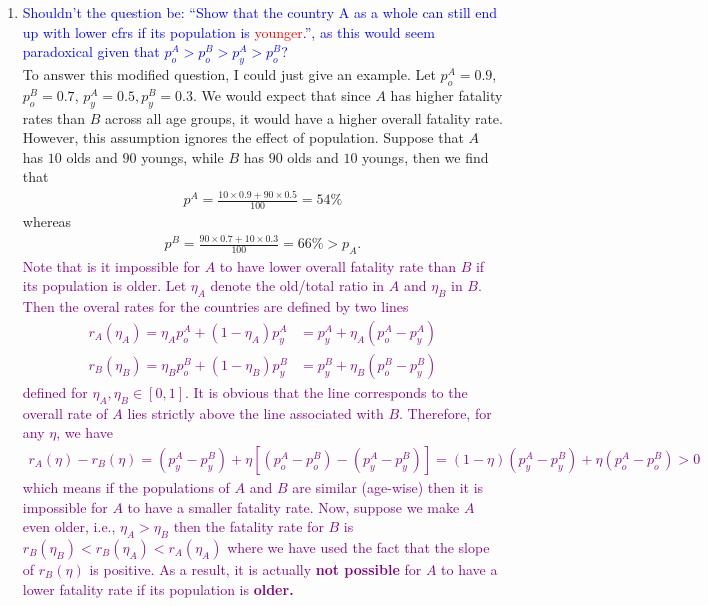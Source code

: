 \documentclass{article}
\theoremstyle{definition}
\newcommand{\f}[2]{\frac{#1}{#2}}
\begin{document}
\begin{enumerate}[label=(\alph*)]
	\item \textcolor{blue}{Shouldn't the question be: ``Show that the country A
	as a whole can still end up with lower cfrs if its population is \textcolor{red}{younger}.'', as  this would seem paradoxical given that $p_o^A > p_o^B > p_y^A > p_o^B$?}\\


	To answer this modified question, I could just give an example. Let $p_o^A = 0.9$, $p_o^B = 0.7$, $p_y^A = 0.5, p_y^B = 0.3$. We would expect that since $A$ has higher fatality rates than $B$ across all age groups, it would have a higher overall fatality rate. However, this assumption ignores the effect of population. Suppose that $A$ has $10$ olds and $90$ youngs,  while $B$ has $90$ olds and $10$ youngs, then we find that
	\begin{align*}
	p^A = \f{10\times 0.9 + 90\times 0.5}{100} = 54\%
	\end{align*}
	whereas
	\begin{align*}
	p^B = \f{90\times 0.7 + 10\times 0.3}{100} = 66\% > p_A.
	\end{align*}
	\textcolor{purple}{Note that is it impossible for $A$ to have lower overall fatality rate than $B$ if its population is older. Let $\eta_A$ denote the old/total ratio in $A$ and $\eta_B$ in $B$. Then the overal rates for the countries are defined by two lines
	\begin{align*}
	r_A(\eta_A) = \eta_A p_o^A + (1-\eta_A) p_y^A &= p_y^A + \eta_A(p_o^A - p_y^A)\\ 
	r_B(\eta_B) = \eta_B p_o^B + (1-\eta_B) p_y^B &= p_y^B + \eta_B(p_o^B - p_y^B)
	\end{align*}
	defined for $\eta_A,\eta_B\in [0,1]$. It is obvious that the line corresponds to the overall rate of $A$ lies strictly above the line associated with $B$. Therefore, for any $\eta$, we have
	\begin{align*}
	r_A(\eta) - r_B(\eta) = (p_y^A - p_y^B) + \eta[(p_o^A - p_o^B) - (p_y^A - p_y^B)] = (1-\eta)(p_y^A - p_y^B) + \eta(p_o^A -p_o^B) > 0
	\end{align*}
	which means if the populations of $A$ and $B$ are similar (age-wise) then it is impossible for $A$ to have a smaller fatality rate. Now, suppose we make $A$ even older, i.e., $\eta_A > \eta_B$ then the fatality rate for $B$ is $r_B(\eta_B) < r_B(\eta_A) < r_A(\eta_A)$ where we have used the fact that the slope of $r_B(\eta)$ is positive. As a result, it is actually \textbf{not possible} for $A$ to have a lower fatality rate if its population is \textbf{older.}  }
	

\end{enumerate}
\end{document}
